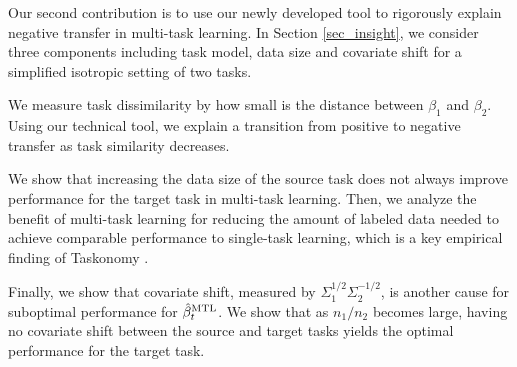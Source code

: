 Our second contribution is to use our newly developed tool to rigorously explain negative transfer in multi-task learning.
In Section \ref{sec_insight}, we consider three components including task model, data size and covariate shift for a simplified isotropic setting of two tasks.
\squishlist
		\item We measure task dissimilarity by how small is the distance between $\beta_1$ and $\beta_2$.
		Using our technical tool, we explain a transition from positive to negative transfer as task similarity decreases.
		\item We show that increasing the data size of the source task does not always improve performance for the target task in multi-task learning.
	Then, we analyze the benefit of multi-task learning for reducing the amount of labeled data needed to achieve comparable performance to single-task learning, which is a key empirical finding of Taskonomy \cite{ZSSGM18}.
		\item Finally, we show that covariate shift, measured by $\Sigma_1^{1/2}\Sigma_2^{-1/2}$, is another cause for suboptimal performance for $\hat{\beta}_t^{\text{MTL}}$.
		We show that as $n_1 / n_2$ becomes large, having no covariate shift between the source and target tasks yields the optimal performance for the target task.
\squishend

